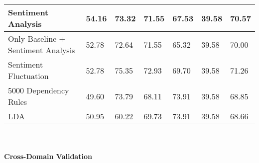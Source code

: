 \begin{table}[h]
\begin{tabular}{|l|l|l|l|l|l|l|}
Sentiment Analysis                 & 54.16                                                & 73.32                         & \cellcolor[HTML]{C0C0C0}71.55 & 67.53                         & 39.58                         & \cellcolor[HTML]{C0C0C0}70.57 \\ \hline
Only Baseline + Sentiment Analysis & 52.78                                                & 72.64                         & \cellcolor[HTML]{C0C0C0}71.55 & 65.32                         & 39.58                         & 70.00                         \\ \hline
Sentiment Fluctuation              & 52.78                                                & \cellcolor[HTML]{656565}75.35 & \cellcolor[HTML]{656565}72.93 & 69.70                         & 39.58                         & \cellcolor[HTML]{656565}71.26 \\ \hline
5000 Dependency Rules              & 49.60                                                & 73.79                         & 68.11                         & 73.91                         & 39.58                         & 68.85                         \\ \hline
LDA                                & 50.95                                                & 60.22                         & 69.73                         & 73.91                         & 39.58                         & 68.66                         \\ \hline
\end{tabular}
\end{table}
\\
\\
\textbf{Cross-Domain Validation}
